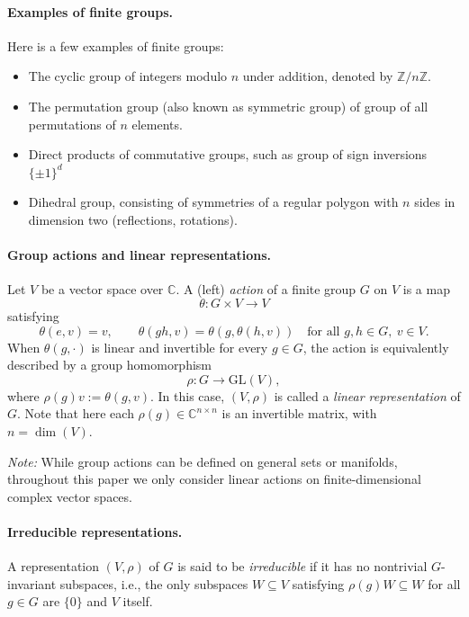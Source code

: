 \documentclass[11pt]{article}
\theoremstyle{plain}
\theoremstyle{definition}
\theoremstyle{remark}
\begin{document}
\paragraph{Examples of finite groups.} Here is a few examples of finite groups:
\begin{itemize}
    \item The cyclic group of integers modulo $n$ under addition, denoted by $\mathbb{Z}/n\mathbb{Z}$.
    \item The permutation group (also known as symmetric group) of group of all permutations of $n$ elements.
    \item Direct products of commutative groups, such as group of sign inversions $\{ \pm 1\}^d$
    \item Dihedral group, consisting of symmetries of a regular polygon with $n$ sides in dimension two (reflections, rotations).
\end{itemize}

\paragraph{Group actions and linear representations.}
Let $V$ be a vector space over $\mathbb{C}$. A (left) \emph{action} of a finite group $G$ on $V$ is a map
\[
\theta : G \times V \to V
\]
satisfying
\[
\theta(e,v) = v, \qquad 
\theta(gh, v) = \theta(g, \theta(h, v))
\quad \text{for all } g,h \in G, \ v \in V.
\]
When $\theta(g,\cdot)$ is linear and invertible for every $g \in G$, the action is equivalently described by a group homomorphism
\[
\rho : G \to \mathrm{GL}(V),
\]
where $\rho(g)v := \theta(g,v)$. In this case, $(V,\rho)$ is called a \emph{linear representation} of $G$. Note that here each $\rho(g) \in \mathbb{C}^{n \times n}$ is an invertible matrix, with $n = \dim(V)$.

\emph{Note:} While group actions can be defined on general sets or manifolds, throughout this paper we only consider linear actions on finite-dimensional complex vector spaces.

\paragraph{Irreducible representations.}
A representation $(V,\rho)$ of $G$ is said to be \emph{irreducible} if it has no nontrivial $G$-invariant subspaces, i.e., the only subspaces $W \subseteq V$ satisfying $\rho(g)W \subseteq W$ for all $g \in G$ are $\{0\}$ and $V$ itself.
\end{document}
